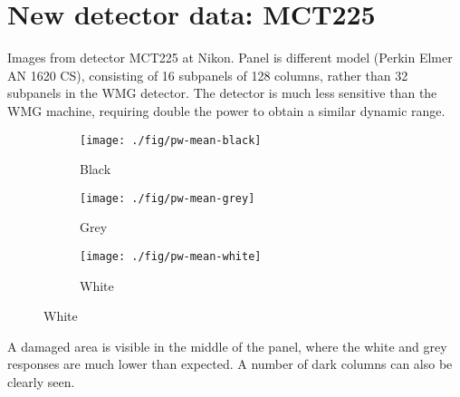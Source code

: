 \documentclass[10pt,fleqn]{article}
\begin{document}
\section{New detector data: MCT225}

Images from detector MCT225 at Nikon. Panel is different model (Perkin Elmer AN 1620 CS), consisting of 16 subpanels of 128 columns, rather than 32 subpanels in the WMG detector. The detector is much less sensitive than the WMG machine, requiring double the power to obtain a similar dynamic range.


\begin{figure}[!ht]
\caption{Pixelwise means from MCT225}
\centering

\begin{subfigure}[t]{0.32\textwidth}
\caption{Black}
\texttt{[image: ./fig/pw-mean-black]}
\end{subfigure}
%
\begin{subfigure}[t]{0.32\textwidth}
\caption{Grey}
\texttt{[image: ./fig/pw-mean-grey]}
\end{subfigure}
%
\begin{subfigure}[t]{0.32\textwidth}
\caption{White}
\texttt{[image: ./fig/pw-mean-white]}
\end{subfigure}
\end{figure}

A damaged area is visible in the middle of the panel, where the white and grey responses are much lower than expected. A number of dark columns can also be clearly seen.
\end{document}

